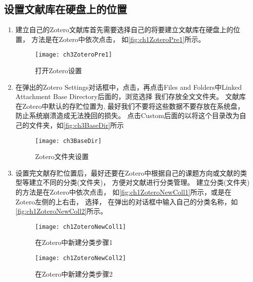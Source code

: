 \documentclass[theorem=false,mathfont=none,openany,sub3section]{easybook}
\begin{document}
\subsection{设置文献库在硬盘上的位置} 
\begin{enumerate}
	\item 
	建立自己的Zotero文献库首先需要选择自己的将要建立文献库在硬盘上的位置，
	方法是在Zotero中依次点击，
	如\autoref{fig:ch1ZoteroPre1}所示。
	\begin{figure}[htbp]
		\centering
		\texttt{[image: ch3ZoteroPre1]}
		\caption{打开Zotero设置}
		\label{fig:ch1ZoteroPre1}
	\end{figure}
	
	\item 
	在弹出的Zotero Settings对话框中，点击，再点击Files and Folders中Linked Attachment Base Directory后面的，浏览选择
	我们存放全文文件夹。
	文献库在Zotero中默认的存贮位置为,
	最好我们不要将这些数据不要存放在系统盘，防止系统崩溃造成无法挽回的损失。
	点击Custom后面的以将这个目录改为自己的文件夹，如\autoref{fig:ch3BaseDir}所示
	\begin{figure}[htbp]
		\centering
		\texttt{[image: ch3BaseDir]}
		\caption{Zotero文件夹设置}
		\label{fig:ch3BaseDir}
	\end{figure}
	\item \label{sec:creat_folder}
	设置完文献存贮位置后，最好还要在Zotero中根据自己的课题方向或文献的类型等建立不同的分类(文件夹)，
	方便对文献进行分类管理。
	建立分类(文件夹)的方法是在Zotero中依次点击，
	如\autoref{fig:ch1ZoteroNewColl1}所示，或是在Zotero左侧的上右击，
	选择，
	在弹出的对话框中输入自己的分类名称，如\autoref{fig:ch1ZoteroNewColl2}所示。
	\begin{figure}
		\centering
		\begin{minipage}[t]{\dimexpr0.5\textwidth-4em}
			\centering
			\texttt{[image: ch1ZoteroNewColl1]}
			\caption{在Zotero中新建分类步骤1}
			\label{fig:ch1ZoteroNewColl1}
		\end{minipage}
		\hspace{1.5cm}
		\begin{minipage}[t]{\dimexpr0.5\textwidth-4em}
			\centering
			\texttt{[image: ch1ZoteroNewColl2]}
			\caption{在Zotero中新建分类步骤2}
			\label{fig:ch1ZoteroNewColl2}
		\end{minipage}

\end{figure}
\end{enumerate}
\end{document}
